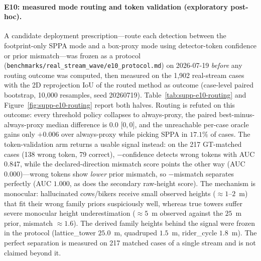 \documentclass[10pt]{article}
\begin{document}
\begin{table}[!htbp]
\centering
\scriptsize
\caption{Real-stream token arm (SPPA-MVFit only; exploratory post-hoc): the
138 GT-matched cases where the real detector emitted a wrong family token
(114 cow\(\to\)tower, 24 biker\(\to\)tower). Refitting with the correct token
collapses the 2D reprojection fit---the correct prior cannot explain the
misleading evidence that triggered the wrong label.}
\label{tab:supp-real-stream-token}

\end{table}

\paragraph{E10: measured mode routing and token validation (exploratory post-hoc).}
A candidate deployment prescription---route each detection between
the footprint-only SPPA mode and a box-proxy mode using detector-token
confidence or prior mismatch---was frozen as a protocol
(\texttt{benchmarks/real\_stream\_wave/e10\_protocol.md}) on 2026-07-19
\emph{before} any routing outcome was computed, then measured on the 1,902
real-stream cases with the 2D reprojection IoU of the routed method as
outcome (case-level paired bootstrap, 10,000 resamples, seed 20260719).
Table~\ref{tab:supp-e10-routing} and Figure~\ref{fig:supp-e10-routing} report
both halves. Routing is refuted on this outcome: every threshold policy
collapses to always-proxy, the paired best-minus-always-proxy median
difference is \(0.0\) [\(0,0\)], and the unreachable per-case oracle gains
only \(+0.006\) over always-proxy while picking SPPA in \(17.1\%\) of cases.
The token-validation arm returns a usable signal instead: on the 217
GT-matched cases (138 wrong token, 79 correct), \(-\)confidence detects wrong
tokens with AUC \(0.847\), while the declared-direction mismatch score points
the other way (AUC \(0.000\))---wrong tokens show \emph{lower} prior
mismatch, so \(-\)mismatch separates perfectly (AUC \(1.000\), as does the
secondary raw-height score). The mechanism is monocular: hallucinated
cows/bikers receive small observed heights (\(\approx\)\(1\)--\(2\)~m) that
fit their wrong family priors suspiciously well, whereas true towers suffer
severe monocular height underestimation (\(\approx\)\(5\)~m observed against
the \(25\)~m prior, mismatch \(\approx\)\(1.6\)). The derived family heights
behind the signal were frozen in the protocol (lattice\_tower \(25.0\)~m,
quadruped \(1.5\)~m, rider\_cycle \(1.8\)~m). The perfect separation is
measured on 217 matched cases of a single stream and is not claimed beyond
it.
\end{document}
